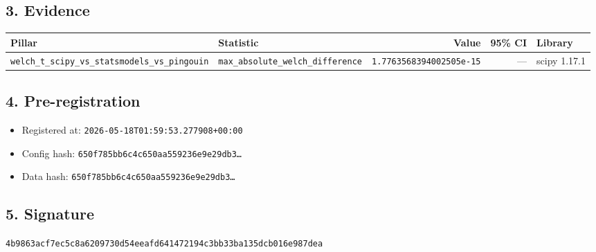 \documentclass{article}
\begin{document}
\subsection*{3. Evidence}
\begin{tabular}{llrrl}\toprule
\textbf{Pillar} & \textbf{Statistic} & \textbf{Value} & \textbf{95\% CI} & \textbf{Library} \\\midrule
\texttt{welch\_t\_scipy\_vs\_statsmodels\_vs\_pingouin} & \texttt{max\_absolute\_welch\_difference} & \texttt{1.7763568394002505e-15} & --- & scipy 1.17.1 \\
\bottomrule\end{tabular}
\subsection*{4. Pre-registration}
\begin{itemize}
\item Registered at: \texttt{2026-05-18T01:59:53.277908+00:00}
\item Config hash: \texttt{650f785bb6c4c650aa559236e9e29db3\dots}
\item Data hash: \texttt{650f785bb6c4c650aa559236e9e29db3\dots}
\end{itemize}
\subsection*{5. Signature}
\texttt{4b9863acf7ec5c8a6209730d54eeafd641472194c3bb33ba135dcb016e987dea}\\
\end{document}
